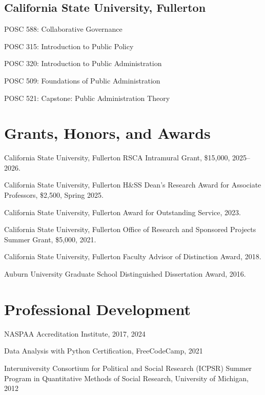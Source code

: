 \documentclass[12pt,letterpaper]{article}
\renewenvironment{itemize}{
  \begin{list}{}{
    \setlength{\leftmargin}{1.5em}
    \setlength{\itemsep}{0.25em}
    \setlength{\parskip}{0pt}
    \setlength{\parsep}{0.25em}
  }
}{
  \end{list}
}
\begin{document}
\subsection*{California State University, Fullerton}
\begin{itemize}\leftmargin=2pt\itemindent=-15pt
  \item POSC 588: Collaborative Governance
  \item POSC 315: Introduction to Public Policy
  \item POSC 320: Introduction to Public Administration
  \item POSC 509: Foundations of Public Administration
  \item POSC 521: Capstone: Public Administration Theory
\end{itemize}

\section*{Grants, Honors, and Awards}
\begin{itemize}\leftmargin=2pt\itemindent=-15pt
  \item California State University, Fullerton RSCA Intramural Grant, \$15,000, 2025--2026.
  \item California State University, Fullerton H\&SS Dean's Research Award for Associate Professors, \$2,500, Spring 2025.
  \item California State University, Fullerton Award for Outstanding Service, 2023.
  \item California State University, Fullerton Office of Research and Sponsored Projects Summer Grant, \$5,000, 2021.
  \item California State University, Fullerton Faculty Advisor of Distinction Award, 2018.
  \item Auburn University Graduate School Distinguished Dissertation Award, 2016.
\end{itemize}

\section*{Professional Development}
\begin{itemize}\leftmargin=2pt\itemindent=-15pt
  \item NASPAA Accreditation Institute, 2017, 2024
  \item Data Analysis with Python Certification, FreeCodeCamp, 2021
  \item Interuniversity Consortium for Political and Social Research (ICPSR) Summer Program in Quantitative Methods of Social Research, University of Michigan, 2012
\end{itemize}
\end{document}
